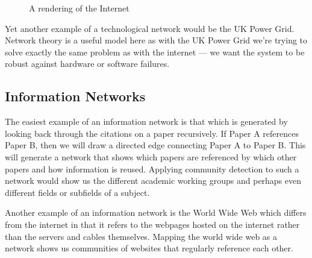 \begin{figure}
    \begin{center}
    \end{center}
    \caption{A rendering of the Internet}
    \label{fig:internet}
\end{figure}

Yet another example of a technological network would be the UK Power Grid. Network theory is a useful model here as with the UK Power Grid we're trying to solve exactly the same problem as with the internet --- we want the system to be robust against hardware or software failures.

\subsection{Information Networks}\label{sec:Information Networks}
The easiest example of an information network is that which is generated by looking back through the citations on a paper recursively. If Paper A references Paper B, then we will draw a directed edge connecting Paper A to Paper B. This will generate a network that shows which papers are referenced by which other papers and how information is reused. Applying community detection to such a network would show us the different academic working groups and perhaps even different fields or subfields of a subject.

Another example of an information network is the World Wide Web which differs from the internet in that it refers to the webpages hosted on the internet rather than the servers and cables themselves. Mapping the world wide web as a network shows us communities of websites that regularly reference each other.
